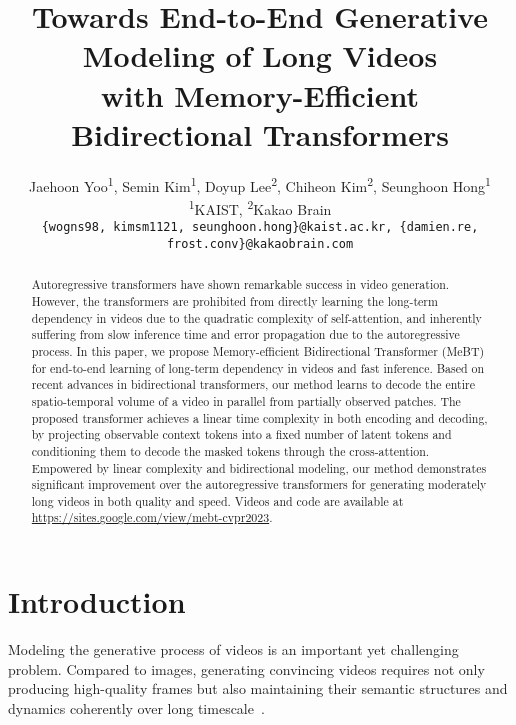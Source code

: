\documentclass[10pt,twocolumn,letterpaper]{article}
\begin{document}
\title{Towards End-to-End Generative Modeling of Long Videos\\with Memory-Efficient Bidirectional Transformers}
\author{Jaehoon Yoo\textsuperscript{\rm 1}, Semin Kim\textsuperscript{\rm 1},  Doyup Lee\textsuperscript{\rm 2}, Chiheon Kim\textsuperscript{\rm 2}, Seunghoon Hong\textsuperscript{\rm 1}\\
\textsuperscript{\rm 1}KAIST, 
\textsuperscript{\rm 2}Kakao Brain\\
{\tt\small \{wogns98, kimsm1121, seunghoon.hong\}@kaist.ac.kr, \{damien.re, frost.conv\}@kakaobrain.com}}
\maketitle

\begin{abstract}
   Autoregressive transformers have shown remarkable success in video generation. 
However, the transformers are prohibited from directly learning the long-term dependency in videos due to the quadratic complexity of self-attention, and inherently suffering from slow inference time and error propagation due to the autoregressive process.  
   In this paper, we propose Memory-efficient Bidirectional Transformer (MeBT) for end-to-end learning of long-term dependency in videos and fast inference. 
   Based on recent advances in bidirectional transformers, our method learns to decode the entire spatio-temporal volume of a video in parallel from partially observed patches. 
   The proposed transformer achieves a linear time complexity in both encoding and decoding, by projecting observable context tokens into a fixed number of latent tokens and conditioning them to decode the masked tokens through the cross-attention. 
Empowered by linear complexity and bidirectional modeling, our method demonstrates significant improvement over the autoregressive transformers for generating moderately long videos in both quality and speed. Videos and code are available at \href{https://sites.google.com/view/mebt-cvpr2023}{https://sites.google.com/view/mebt-cvpr2023}.
\end{abstract}

\section{Introduction}




Modeling the generative process of videos is an important yet challenging problem.
Compared to images, generating convincing videos requires not only producing high-quality frames but also maintaining their semantic structures and dynamics coherently over long timescale~\cite{DIGAN, TATS, StyleGAN-V, HVP, CogVideo, CWVAE}.
\end{document}
